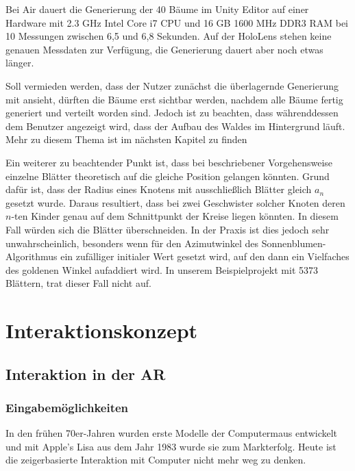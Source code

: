 Bei Air dauert die Generierung der 40 Bäume im Unity Editor auf einer Hardware mit 2.3 GHz Intel Core i7 CPU und 16 GB 1600 MHz DDR3 RAM bei 10 Messungen zwischen 6,5 und 6,8 Sekunden. Auf der HoloLens stehen keine genauen Messdaten zur Verfügung, die Generierung dauert aber noch etwas länger.

Soll vermieden werden, dass der Nutzer zunächst die überlagernde Generierung mit ansieht, dürften die Bäume erst sichtbar werden, nachdem alle Bäume fertig generiert und verteilt worden sind. Jedoch ist zu beachten, dass währenddessen dem Benutzer angezeigt wird, dass der Aufbau des Waldes im Hintergrund läuft. Mehr zu diesem Thema ist im nächsten Kapitel zu finden

Ein weiterer zu beachtender Punkt ist, dass bei beschriebener Vorgehensweise einzelne Blätter theoretisch auf die gleiche Position gelangen könnten. Grund dafür ist, dass der Radius eines Knotens mit ausschließlich Blätter gleich $a_n$ gesetzt wurde. Daraus resultiert, dass bei zwei Geschwister solcher Knoten deren $n$-ten Kinder genau auf dem Schnittpunkt der Kreise liegen könnten. In diesem Fall würden sich die Blätter überschneiden. In der Praxis ist dies jedoch sehr unwahrscheinlich, besonders wenn für den Azimutwinkel des Sonnenblumen-Algorithmus ein zufälliger initialer Wert gesetzt wird, auf den dann ein Vielfaches des goldenen Winkel aufaddiert wird. In unserem Beispielprojekt mit 5373 Blättern, trat dieser Fall nicht auf.


\chapter{Interaktionskonzept}

\section{Interaktion in der AR}
\subsection{Eingabemöglichkeiten}

In den frühen 70er-Jahren wurden erste Modelle der Computermaus entwickelt und mit Apple's Lisa aus dem Jahr 1983 wurde sie zum Markterfolg. Heute ist die zeigerbasierte Interaktion mit Computer nicht mehr weg zu denken.

